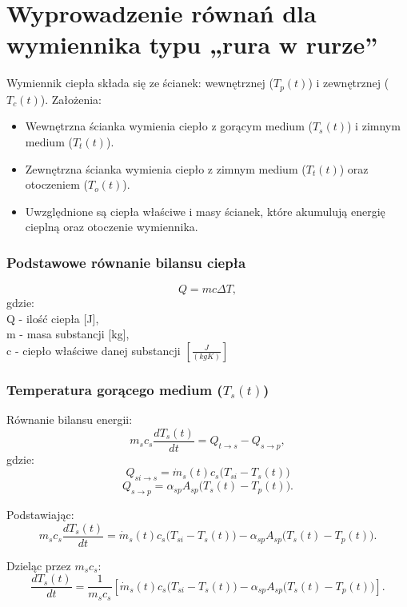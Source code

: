 \documentclass{article}
\begin{document}
	
	\section*{Wyprowadzenie równań dla wymiennika typu „rura w rurze”}
	
	Wymiennik ciepła składa się ze ścianek: wewnętrznej (\( T_p(t) \)) i zewnętrznej (\( T_c(t) \)). Założenia:
	\begin{itemize}
		\item Wewnętrzna ścianka wymienia ciepło z gorącym medium (\( T_s(t) \)) i zimnym medium (\( T_t(t) \)).
		\item Zewnętrzna ścianka wymienia ciepło z zimnym medium (\( T_t(t) \)) oraz otoczeniem (\( T_o(t) \)).
		\item Uwzględnione są ciepła właściwe i masy ścianek, które akumulują energię cieplną oraz otoczenie wymiennika.
	\end{itemize}
	
	
	\subsubsection*{Podstawowe równanie bilansu ciepła}
	\[
	Q = m  c \Delta T,
	\]
	gdzie:\\
	
	Q - ilość ciepła [J],\\
	
	m - masa substancji [kg],\\
	
	c - ciepło właściwe danej substancji  \( \left[\frac{J}{(kgK)}\right] 
	\)\leavevmode
	
	
	\subsubsection*{Temperatura gorącego medium (\( T_s(t) \))}
	
	Równanie bilansu energii:
	\[
	m_s c_s \frac{dT_s(t)}{dt} = {Q}_{t \to s} - {Q}_{s \to p},
	\]
	gdzie:
	\[
	{Q}_{si \to s} = \dot{m}_s (t) c_s \big(T_{si} - T_s(t) \big) 
	\]
	\[
	{Q}_{s \to p} =\alpha_{sp} A_{sp} \big(T_s(t) - T_p(t)\big).
	\]
	
	Podstawiając:
	\[
	m_s c_s \frac{dT_s(t)}{dt} = \dot{m}_s (t) c_s \big(T_{si} - T_s(t) \big) - \alpha_{sp} A_{sp} \big(T_s(t) - T_p(t)\big).
	\]
	
	Dzieląc przez \( m_s c_s \):
	\[
	\frac{dT_s(t)}{dt} = \frac{1}{m_s c_s} \left[\dot{m}_s (t) c_s \big(T_{si} - T_s(t) \big) - \alpha_{sp} A_{sp} \big(T_s(t) - T_p(t)\big)\right].
	\]
	
\end{document}
